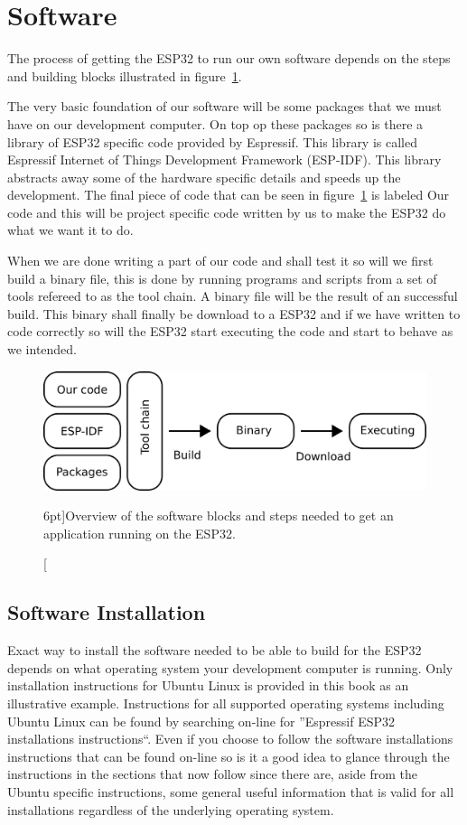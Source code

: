 \documentclass{tufte-book}
\begin{document}
\section{Software}\label{sec:software}

The process of getting the ESP32 to run our own software depends on the steps and building blocks illustrated in figure~\ref{fig:software_anatomy}.

The very basic foundation of our software will be some packages that we must have on our development computer. On top op these packages so is there a library of ESP32 specific code provided by Espressif. This library is called Espressif Internet of Things Development Framework (ESP-IDF). This library abstracts away some of the hardware specific details and speeds up the development. The final piece of code that can be seen in figure~\ref{fig:software_anatomy} is labeled Our code and this will be project specific code written by us to make the ESP32 do what we want it to do.

When we are done writing a part of our code and shall test it so will we first build a binary file, this is done by running programs and scripts from a set of tools refereed to as the tool chain. A binary file will be the result of an successful build. This binary shall finally be download to a ESP32 and if we have written to code correctly so will the ESP32 start executing the code and start to behave as we intended. 

\begin{figure}
	\includegraphics[scale=1.0]{software_anatomy.png}
	\caption[Software development $n$.][6pt]{Overview of the software blocks and steps needed to get an application running on the ESP32.}
	\label{fig:software_anatomy}
\end{figure}

\subsection{Software Installation}
Exact way to install the software needed to be able to build for the ESP32 depends on what operating system your development computer is running.
Only installation instructions for Ubuntu Linux is provided in this book as an illustrative example. Instructions for all supported operating systems including Ubuntu Linux can be found by searching on-line for ''Espressif ESP32 installations instructions``.
Even if you choose to follow the software installations instructions that can be found on-line so is it a good idea to glance through the instructions in the sections that now follow since there are, aside from the Ubuntu specific instructions, some general useful information that is valid for all installations regardless of the underlying operating system.
\end{document}
